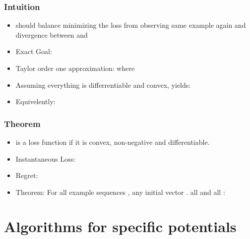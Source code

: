 \documentclass{beamer}
\begin{document}
\begin{frame}
  \frametitle{Intuition}
  \begin{itemize}
  \item \R{$\vu$} should balance minimizing the loss from observing same example again
    and divergence between \R{$\vu$} and 
  \item Exact Goal:
  \item Taylor order one approximation:
     where \\
    \item Assuming everything is differrentiable and convex,  yields:
    \item Equivelently: 
  \end{itemize}
\end{frame}

\begin{frame}
  \frametitle{Theorem}
  \begin{itemize}
  \item \R{$\ell:\real \times \real \to \real$} is a 
    loss function if it is convex, non-negative and differentiable.
  \item Instantaneous Loss: 
  \item Regret: 
  \item Theorem: For all example sequences
    , any initial vector
    . all  and all :
  \end{itemize}
\end{frame}

\section{Algorithms for specific potentials}
\end{document}
